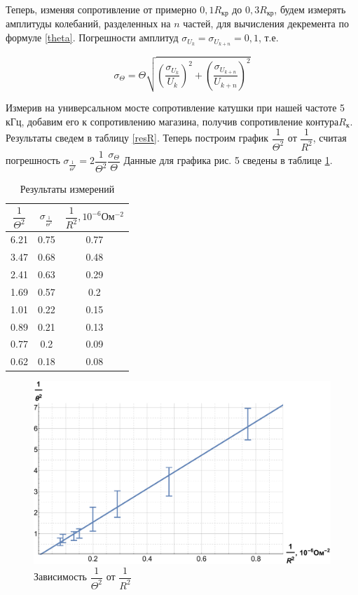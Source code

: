 \documentclass[12pt]{kiarticle} %
\begin{document}
Теперь, изменяя сопротивление от примерно $ 0,1 R_{кр} $ до $ 0,3 R_{кр} $, будем измерять амплитуды колебаний, разделенных на $ n $ частей, для вычисления декремента по формуле \eqref{theta}. Погрешности амплитуд $  \sigma_{U_k} = \sigma_{U_{k+n}} = 0,1 $, т.е. 

\begin{equation}\label{}
\sigma_{\Theta} = \Theta \sqrt{ \left( \dfrac{ \sigma_{U_k}}{U_k} \right)^2 + \left( \dfrac{ \sigma_{U_{k+n}} }{U_{k+n}} \right)^2 }
\end{equation}

Измерив на универсальном мосте сопротивление катушки при нашей частоте 5 кГц, добавим его к сопротивлению магазина, получив сопротивление контура$ R_к $. Результаты сведем в таблицу \ref{resR}. Теперь построим график $ \dfrac{1}{\Theta^2} $ от $ \dfrac{1}{R^2} $, считая погрешность $ \sigma_{\frac{1}{\Theta^2}} = 2 \dfrac{1}{\Theta^2} \dfrac{\sigma_\Theta}{\Theta}$ Данные для графика  рис. 5 сведены в таблице \ref{res}.



\begin{table}[h!]
	\centering
	\caption{Результаты измерений}
	\begin{tabular}{|c|c|c|}
		\hline
	$ \dfrac{1}{\Theta^2} $& $ \sigma_{\frac{1}{\Theta^2}} $ & $ \dfrac{1}{R^2}, 10^{-6} Ом^{-2}$  \\
		\hline
		6.21 & 0.75 & 0.77 \\
		3.47 & 0.68 & 0.48 \\
		2.41 & 0.63 & 0.29 \\
		1.69 & 0.57 & 0.2 \\
		1.01 & 0.22 & 0.15 \\
		0.89 & 0.21 & 0.13 \\
		0.77 & 0.2 & 0.09 \\
		0.62 & 0.18 & 0.08 \\
		\hline
	\end{tabular}%
	\label{res}%
\end{table}%

\begin{figure}[h!]
	\includegraphics[scale=0.5]{teta.pdf}
	\caption{Зависимость $ \dfrac{1}{\Theta^2} $ от $ \dfrac{1}{R^2} $}
\end{figure}
\end{document}

